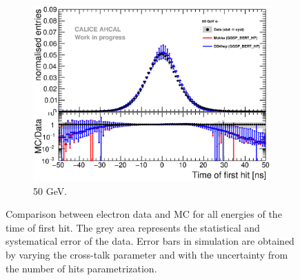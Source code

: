\begin{figure}[htbp!]
  \hfill
  \begin{subfigure}[t]{0.49\textwidth}
    \centering
    \includegraphics[width=1\textwidth]{../Thesis_Plots/Timing/Electrons/Plots/Comparison_SimData_Electrons50GeV.eps}
    \caption{50 GeV.}\label{fig:elec_sim_data_50GeV}
  \end{subfigure}
  \caption{Comparison between electron data and MC for all energies of the time of first hit. The grey area represents the statistical and systematical error of the data. Error bars in simulation are obtained by varying the cross-talk parameter and with the uncertainty from the number of hits parametrization.} \label{fig:sim_data_elec_add}
\end{figure}

